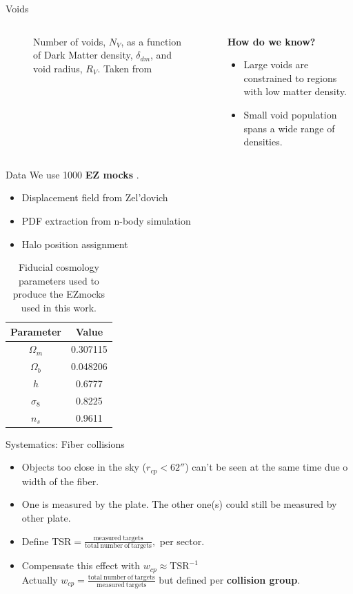 \documentclass{beamer}
\begin{document}
\begin{frame}[allowframebreaks]{Voids}
\begin{columns}
\begin{column}{0.49\linewidth}
\begin{figure}
			\caption{Number of voids, $N_V$, as a function of Dark Matter density, $\delta_{dm}$, and void radius, $R_V$. Taken from \citep{Zhao2016}}
			\label{fig:radiusvsdensity}
		\end{figure}
	\end{column}
	\begin{column}{0.49\linewidth}
		\textbf{How do we know?}
		\begin{itemize}
			\item Large voids are constrained to regions with low matter density.
			\item Small void population spans a wide range of densities.
		\end{itemize}
	
	\end{column}
\end{columns}
\end{frame}
\begin{frame}[allowframebreaks]{Data}
	We use 1000 \textbf{EZ mocks} \citet{Zhao2020}.
	\begin{itemize}
		\item<1-> Displacement field from Zel'dovich
		\item<2-> PDF extraction from n-body simulation
		\item<3-> Halo position assignment
	\end{itemize}
\begin{table}
	\centering
	\caption{Fiducial cosmology parameters used to produce the EZmocks used in this work.}
	\label{tab:fiducial}
	\begin{tabular}{cc}
		\hline
		Parameter & Value \\
		\hline
		$\Omega_m$ & 0.307115 \\
		$\Omega_b$ & 0.048206\\
		$h$ & 0.6777 \\
		$\sigma_8$ & 0.8225\\
		$n_s$ & 0.9611\\
		\hline
	\end{tabular}	
\end{table}
\end{frame}
\begin{frame}[allowframebreaks]{Systematics: Fiber collisions}
	\begin{itemize}
		\item Objects too close in the sky ($r_{cp}<62''$) can't be seen at the same time due o width of the fiber.
		\item One is measured by the plate. The other one(s) could still be measured by other plate.
		\item Define $\mathrm{TSR} = \frac{\mathrm{measured\ targets}}{\mathrm{total\ number\ of\ targets}},$ per sector.
		\item Compensate this effect with $w_{cp} \approx \mathrm{TSR}^{-1}$\\ Actually $w_{cp} = \frac{\mathrm{total\ number\ of\ targets}}{\mathrm{measured\ targets}}$ but defined per \textbf{collision group}.
	\end{itemize}
\end{frame}
\end{document}
